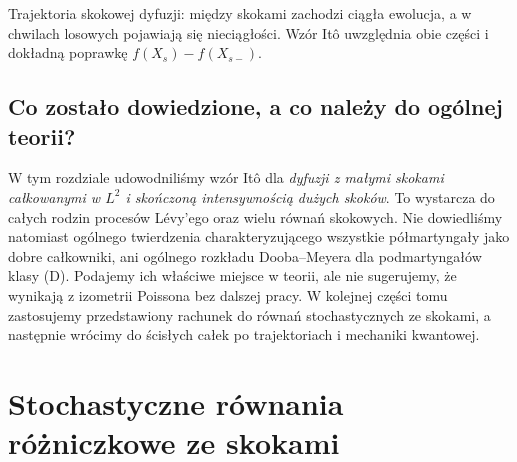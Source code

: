 \documentclass[11pt,a4paper,oneside]{report}
\numberwithin{equation}{chapter}
\theoremstyle{plain}
\theoremstyle{definition}
\theoremstyle{remark}
\begin{document}
\begin{center}
\par\smallskip\small Trajektoria skokowej dyfuzji:
między skokami zachodzi ciągła ewolucja, a w chwilach
losowych pojawiają się nieciągłości. Wzór Itô uwzględnia
obie części i dokładną poprawkę $f(X_s)-f(X_{s-})$.
\end{center}

\section{Co zostało dowiedzione, a co należy do ogólnej teorii?}

W tym rozdziale udowodniliśmy wzór Itô dla
\emph{dyfuzji z małymi skokami całkowanymi w $L^2$
i skończoną intensywnością dużych skoków}.
To wystarcza do całych rodzin procesów Lévy'ego oraz
wielu równań skokowych. Nie dowiedliśmy natomiast
ogólnego twierdzenia charakteryzującego wszystkie
półmartyngały jako dobre całkowniki, ani ogólnego
rozkładu Dooba--Meyera dla podmartyngałów klasy (D).
Podajemy ich właściwe miejsce w teorii, ale nie sugerujemy,
że wynikają z izometrii Poissona bez dalszej pracy.
W kolejnej części tomu zastosujemy przedstawiony rachunek
do równań stochastycznych ze skokami, a następnie wrócimy
do ścisłych całek po trajektoriach i mechaniki kwantowej.

\chapter{Stochastyczne równania różniczkowe ze skokami}
\label{ch:jump-sde}
\end{document}
